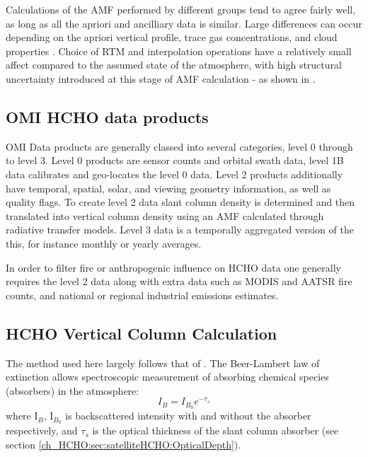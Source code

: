     Calculations of the AMF performed by different groups tend to agree fairly well, as long as all the apriori and ancilliary data is similar.
    Large differences can occur depending on the apriori vertical profile, trace gas concentrations, and cloud properties \citep{Lorent2017}.
    Choice of RTM and interpolation operations have a relatively small affect compared to the assumed state of the atmosphere, with high structural uncertainty introduced at this stage of AMF calculation - as shown in \cite{Lorent2017}.
  
  \subsection{OMI HCHO data products}
    OMI Data products are generally classed into several categories, level 0 through to level 3. Level 0 products are sensor counts and orbital swath data, level 1B data calibrates and geo-locates the level 0 data. Level 2 products additionally have temporal, spatial, solar, and viewing geometry information, as well as quality flags.
    To create level 2 data slant column density is determined and then translated into vertical column density using an AMF calculated through radiative transfer models. Level 3 data is a temporally aggregated version of the this, for instance monthly or yearly averages.
    
    In order to filter fire or anthropogenic influence on HCHO data one generally requires the level 2 data along with extra data such as MODIS and AATSR fire counts, and national or regional industrial emissions estimates.
  
  \subsection{HCHO Vertical Column Calculation}
    \label{ch_HCHO:sec:satelliteHCHO:CalculationOfVC}
    
    The method used here largely follows that of \citet{Palmer2001}.
    The Beer-Lambert law of extinction allows spectroscopic measurement of absorbing chemical species (absorbers) in the atmosphere:
    \begin{equation} \label{ch_HCHO:eqn:beerlambert}
      I_B = I_{B_0} e^{-\tau_s}
    \end{equation}
    where I$_B$, I$_{B_0}$ is backscattered intensity with and without the absorber respectively, and $\tau_s$ is the optical thickness of the slant column absorber (see section \ref{ch_HCHO:sec:satelliteHCHO:OpticalDepth}).

